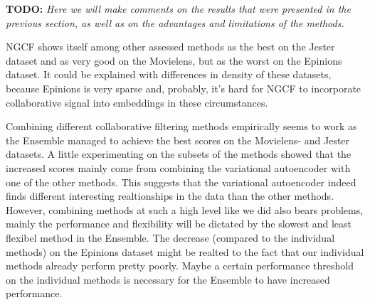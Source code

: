 \textbf{TODO: }
\textit{Here we will make comments on the results that were presented in the previous section, as well as on the advantages and limitations of the methods.}



NGCF shows itself among other assessed methods as the best on the Jester dataset 
and as very good on the Movielens, but as the worst on the Epinions dataset.
It could be explained with differences in density of these datasets, because
Epinions is very sparse and, probably, it's hard for NGCF to incorporate 
collaborative signal into embeddings in these circumstances.



Combining different collaborative filtering methods empirically seems to work as the Ensemble managed to achieve the best scores on the Movielens- and Jester datasets. A little experimenting on the subsets of the methods showed that the increased scores mainly come from combining the variational autoencoder with one of the other methods. This suggests that the variational autoencoder indeed finds different interesting realtionships in the data than the other methods. However, combining methods at such a high level like we did also bears problems, mainly the performance and flexibility will be dictated by the slowest and least flexibel method in the Ensemble. The decrease (compared to the individual methods) on the Epinions dataset might be realted to the fact that our individual methods already perform pretty poorly. Maybe a certain performance threshold on the individual methods is necessary for the Ensemble to have increased performance.
